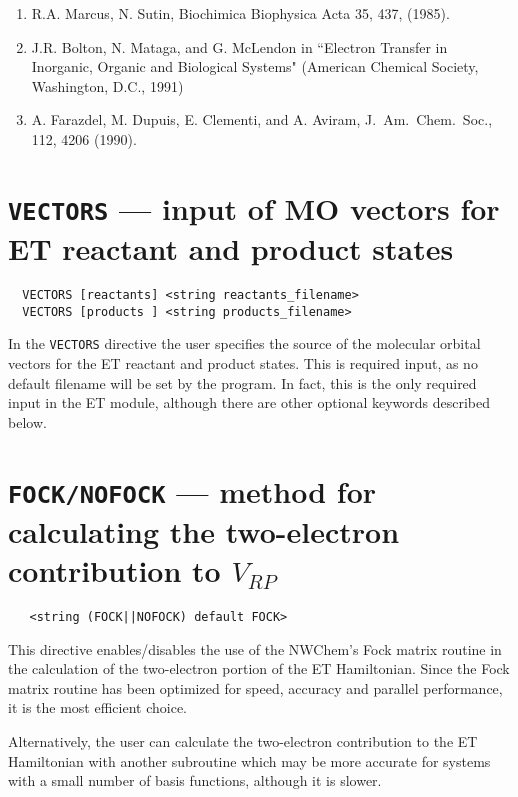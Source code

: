 \begin{enumerate}
\item R.A. Marcus, N. Sutin, Biochimica Biophysica Acta 35, 437, (1985).
\item J.R. Bolton, N. Mataga, and G. McLendon in ``Electron Transfer in Inorganic, Organic and Biological Systems"
(American Chemical Society, Washington, D.C., 1991)
\item A. Farazdel, M. Dupuis, E. Clementi, and A. Aviram, 
J.~Am.~Chem.~Soc., 112, 4206 (1990).
\end{enumerate}

\section{{\tt VECTORS} --- input of MO vectors for ET reactant and product states}
\label{sec:etransvectors}

\begin{verbatim}
  VECTORS [reactants] <string reactants_filename>
  VECTORS [products ] <string products_filename>
\end{verbatim}

In the \verb+VECTORS+ directive the user specifies the source 
of the molecular orbital vectors for the ET reactant and product states. 
This is required input, as no default filename will be set by the program.
In fact, this is the only required input in the ET module, although there are
other optional keywords described below.

\section{{\tt FOCK/NOFOCK} --- method for calculating the two-electron contribution to $V_{RP}$ }
\label{sec:etransfock}

 \begin{verbatim}
   <string (FOCK||NOFOCK) default FOCK>
 \end{verbatim}

This directive enables/disables the use of the NWChem's Fock matrix 
routine in the calculation of the two-electron portion of the ET Hamiltonian.
Since the Fock matrix routine has been optimized for speed, accuracy and parallel performance,
it is the most efficient choice.

Alternatively, the user can calculate the two-electron contribution to the ET Hamiltonian
with another subroutine which may be more accurate for systems with a small
number of basis functions, although it is slower.

